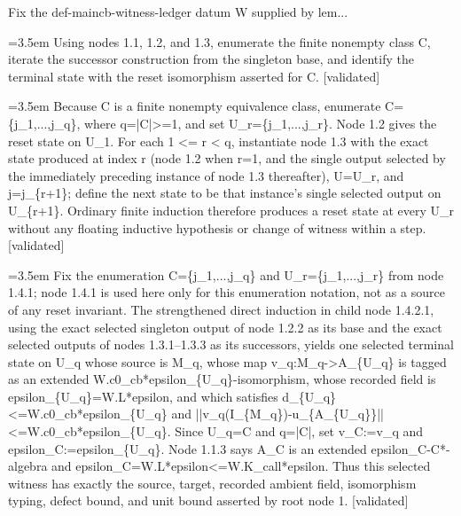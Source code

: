\documentclass{article}
\newcommand{\step}[1]{\par\noindent\hangindent=3.5em\hangafter=1%
  \makebox[3.5em][l]{\textbf{#1.}}}
\newcommand{\steptag}[1]{\hfill{\small\textsf{[#1]}}}
\begin{document}
\begin{proofbox}{Fix the def-maincb-witness-ledger datum W supplied by lem...}
\step{1.4} Using nodes 1.1, 1.2, and 1.3, enumerate the finite nonempty class C, iterate the successor construction from the singleton base, and identify the terminal state with the reset isomorphism asserted for C. \steptag{validated} \\[6pt]
\step{1.4.1} Because C is a finite nonempty equivalence class, enumerate C=\{j\_1,...,j\_q\}, where q=|C|>=1, and set U\_r=\{j\_1,...,j\_r\}. Node 1.2 gives the reset state on U\_1. For each 1 <= r < q, instantiate node 1.3 with the exact state produced at index r (node 1.2 when r=1, and the single output selected by the immediately preceding instance of node 1.3 thereafter), U=U\_r, and j=j\_\{r+1\}; define the next state to be that instance's single selected output on U\_\{r+1\}. Ordinary finite induction therefore produces a reset state at every U\_r without any floating inductive hypothesis or change of witness within a step. \steptag{validated} \\[4pt]
\step{1.4.2} Fix the enumeration C=\{j\_1,...,j\_q\} and U\_r=\{j\_1,...,j\_r\} from node 1.4.1; node 1.4.1 is used here only for this enumeration notation, not as a source of any reset invariant. The strengthened direct induction in child node 1.4.2.1, using the exact selected singleton output of node 1.2.2 as its base and the exact selected outputs of nodes 1.3.1--1.3.3 as its successors, yields one selected terminal state on U\_q whose source is M\_q, whose map v\_q:M\_q->A\_\{U\_q\} is tagged as an extended W.c0\_cb*epsilon\_\{U\_q\}-isomorphism, whose recorded field is epsilon\_\{U\_q\}=W.L*epsilon, and which satisfies d\_\{U\_q\}<=W.c0\_cb*epsilon\_\{U\_q\} and ||v\_q(I\_\{M\_q\})-u\_\{A\_\{U\_q\}\}||<=W.c0\_cb*epsilon\_\{U\_q\}. Since U\_q=C and q=|C|, set v\_C:=v\_q and epsilon\_C:=epsilon\_\{U\_q\}. Node 1.1.3 says A\_C is an extended epsilon\_C-C*-algebra and epsilon\_C=W.L*epsilon<=W.K\_call*epsilon. Thus this selected witness has exactly the source, target, recorded ambient field, isomorphism typing, defect bound, and unit bound asserted by root node 1. \steptag{validated} \\[6pt]

\end{proofbox}
\end{document}
